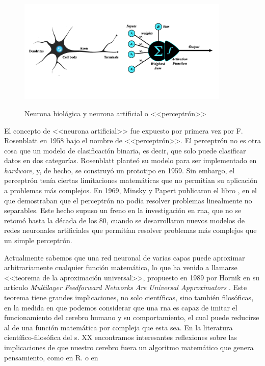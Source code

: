 \begin{figure}[H]
    \caption[Neurona biológica y neurona artificial o <<perceptrón>>]{Neurona biológica y neurona artificial o <<perceptrón>>}
    \centering
    \includegraphics[width=0.9\textwidth]{./figuras/perceptron_with_neuron.png}
    \label{fig:neurona_artificial_natural}
\end{figure}

El concepto de <<neurona artificial>> fue expuesto por primera vez por F. Rosenblatt en 1958 \citep{rothmanTransformersNaturalLanguage2021} bajo el nombre de <<perceptrón>>. El perceptrón no es otra cosa que un modelo de clasificación binaria, es decir, que solo puede clasificar datos en dos categorías. Rosenblatt planteó su modelo para ser implementado en \emph{hardware}, y, de hecho, se construyó un prototipo en 1959. Sin embargo, el perceptrón tenía ciertas limitaciones matemáticas que no permitían su aplicación a problemas más complejos. En 1969, Minsky y Papert publicaron el libro \citep{minsky1969perceptrons}, en el que demostraban que el perceptrón no podía resolver problemas linealmente no separables. Este hecho supuso un freno en la investigación en \gls{rna}, que no se retomó hasta la década de los 80, cuando se desarrollaron nuevos modelos de redes neuronales artificiales que permitían resolver problemas más complejos que un simple perceptrón. 

Actualmente sabemos que una red neuronal de varias capas puede aproximar arbitrariamente cualquier función matemática, lo que ha venido a llamarse <<teorema de la aproximación universal>>, propuesto en 1989 por Hornik en su artículo \emph{Multilayer Feedforward Networks Are Universal Approximators} \citep{hornikMultilayerFeedforwardNetworks1989}. Este teorema tiene grandes implicaciones, no solo científicas, sino también filosóficas, en la medida en que podemos considerar que una \gls{rna} es capaz de imitar el funcionamiento del cerebro humano y su comportamiento, el cual puede reducirse al de una función matemática por compleja que esta sea. En la literatura científico-filosófica del s. XX encontramos interesantes reflexiones sobre las implicaciones de que nuestro cerebro fuera un algoritmo matemático que genera pensamiento, como en R. \cite{penroseNuevaMenteEmperador2015} o en \cite{searleMentesCerebrosCiencia1985}


